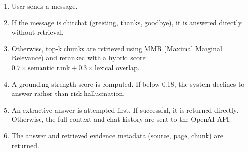 \documentclass[12pt,a4paper]{article}
\begin{document}
\begin{enumerate}[leftmargin=*]
  \item User sends a message.
  \item If the message is chitchat (greeting, thanks, goodbye), it is answered directly
        without retrieval.
  \item Otherwise, top-k chunks are retrieved using MMR (Maximal Marginal Relevance)
        and reranked with a hybrid score:
        $0.7 \times \text{semantic rank} + 0.3 \times \text{lexical overlap}$.
  \item A grounding strength score is computed. If below 0.18, the system declines
        to answer rather than risk hallucination.
  \item An extractive answer is attempted first. If successful, it is returned directly.
        Otherwise, the full context and chat history are sent to the OpenAI API.
  \item The answer and retrieved evidence metadata (source, page, chunk) are returned.
\end{enumerate}
\end{document}
